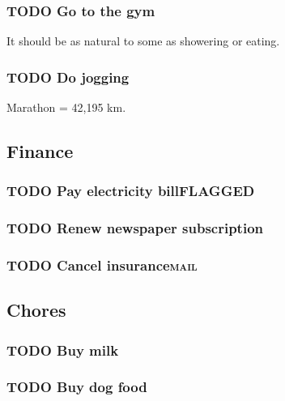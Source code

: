 \documentclass[11pt]{article}
\begin{document}
\subsubsection*{{\bfseries\sffamily TODO} Go to the gym}
\label{sec:org6533bf6}
It should be as natural to some as showering or eating.

\subsubsection*{{\bfseries\sffamily TODO} Do jogging}
\label{sec:orgc404b6b}

Marathon = 42,195 km.

\subsection{Finance}
\label{sec:org7076def}

\subsubsection*{{\bfseries\sffamily TODO} Pay electricity bill\hfill{}\textsc{FLAGGED}}
\label{sec:org87a9be4}

\subsubsection*{{\bfseries\sffamily TODO} Renew newspaper subscription}
\label{sec:orgd91f9af}

\subsubsection*{{\bfseries\sffamily TODO} Cancel insurance\hfill{}\textsc{mail}}
\label{sec:orgeb18016}

\subsection{Chores}
\label{sec:org2c27144}

\subsubsection*{{\bfseries\sffamily TODO} Buy milk}
\label{sec:orgc50ef27}

\subsubsection*{{\bfseries\sffamily TODO} Buy dog food}
\label{sec:org082c865}
\end{document}
